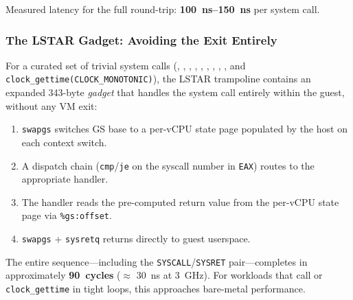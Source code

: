 Measured latency for the full round-trip:
\textbf{\SIrange{100}{150}{\nano\second}} per system call.

\subsubsection{The LSTAR Gadget: Avoiding the Exit Entirely}

For a curated set of trivial system calls (,
, , ,
, , ,
, , and
\texttt{clock\_gettime(CLOCK\_MONOTONIC)}), the LSTAR trampoline
contains an expanded 343-byte \emph{gadget} that handles the system
call entirely within the guest, without any VM exit:

\begin{enumerate}
  \item \texttt{swapgs} switches GS base to a per-vCPU state page
        populated by the host on each context switch.
  \item A dispatch chain (\texttt{cmp}/\texttt{je} on the syscall
        number in \texttt{EAX}) routes to the appropriate handler.
  \item The handler reads the pre-computed return value from the
        per-vCPU state page via \texttt{\%gs:offset}.
  \item \texttt{swapgs} + \texttt{sysretq} returns directly to guest
        userspace.
\end{enumerate}

The entire sequence---including the \texttt{SYSCALL}/\texttt{SYSRET}
pair---completes in approximately \textbf{90~cycles} ($\approx$
\SI{30}{\nano\second} at \SI{3}{\giga\hertz}).  For workloads that
call  or \texttt{clock\_gettime} in tight loops, this
approaches bare-metal performance.

